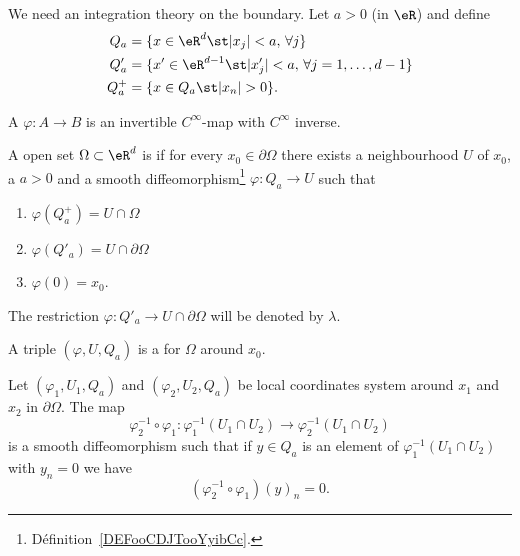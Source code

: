 We need an integration theory on the boundary. Let \( a>0\) (in \( \eR\)) and define
\begin{subequations}
    \begin{align}
        Q_a&=\{ x\in \eR^{d}\st | x_j |<a,\,\forall j \}\\
        Q'_a&=\{ x'\in \eR^{d-1}\st | x'_j |<a,\,\forall j=1,\ldots, d-1 \}\\
        Q^+_a&=\{ x\in Q_a\st | x_n |>0\}.
    \end{align}
\end{subequations}

\begin{definition}          \label{DEFooCDJTooYyibCc}
    A  \( \varphi\colon A\to B\) is an invertible \(  C^{\infty}\)-map with \(  C^{\infty}\) inverse.
\end{definition}

\begin{definition}
    A open set \( \Omega\subset \eR^d\) is  if for every \( x_0\in \partial\Omega\) there exists a neighbourhood \( U\) of \( x_0\), a \( a>0\) and a smooth diffeomorphism\footnote{Définition~\ref{DEFooCDJTooYyibCc}.} \( \varphi\colon Q_a\to U\) such that
    \begin{enumerate}
        \item
            \( \varphi(Q_a^+)=U\cap\Omega\)
        \item
            \( \varphi(Q'_a)=U\cap\partial\Omega\)
        \item
            \( \varphi(0)=x_0\).
    \end{enumerate}
\end{definition}
The restriction \( \varphi\colon Q'_a\to U\cap\partial\Omega\) will be denoted by \( \lambda\).

\begin{definition}
    A triple \( (\varphi,U,Q_a)\) is a  for \( \Omega\) around \( x_0\).
\end{definition}

\begin{lemma}
    Let \( (\varphi_1,U_1,Q_a)\) and \( (\varphi_2,U_2,Q_a)\) be local coordinates system around \( x_1\) and \( x_2\) in \( \partial\Omega\). The map
    \begin{equation}
        \varphi_2^{-1}\circ\varphi_1\colon \varphi_1^{-1}(U_1\cap U_2)\to \varphi_2^{-1}(U_1\cap U_2)
    \end{equation}
    is a smooth diffeomorphism such that if \( y\in Q_a\) is an element of \( \varphi_1^{-1}(U_1\cap U_2)\) with \( y_n=0\) we have
    \begin{equation}
        (\varphi_2^{-1}\circ\varphi_1)(y)_n=0.
    \end{equation}
\end{lemma}

